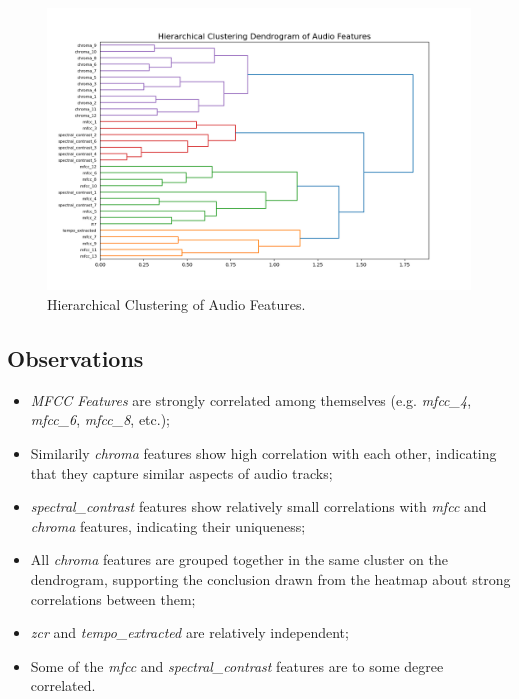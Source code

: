 \begin{center}
\begin{figure}[H]
  \centering
  \includegraphics[width=6in]{img/dendrogram_audio.png}
  \caption{Hierarchical Clustering of Audio Features.}
  \label{Figure:dendrogram_spotify_features}
\end{figure}
\end{center}


\subsection*{Observations}
\begin{itemize}
  \item \textit{MFCC Features} are strongly correlated among themselves (e.g.
    \textit{mfcc\_4}, \textit{mfcc\_6}, \textit{mfcc\_8}, etc.);
  \item Similarily \textit{chroma} features show high correlation with each
    other, indicating that they capture similar aspects of audio tracks;
  \item \textit{spectral\_contrast} features show relatively small
    correlations with \textit{mfcc} and  \textit{chroma} features, indicating 
    their uniqueness;
  \item All \textit{chroma} features are grouped together in the same cluster
    on the dendrogram, supporting the conclusion drawn from the heatmap about
    strong correlations between them;
  \item \textit{zcr} and \textit{tempo\_extracted} are relatively independent;
  \item Some of the \textit{mfcc} and \textit{spectral\_contrast} features
    are to some degree correlated.
\end{itemize}

